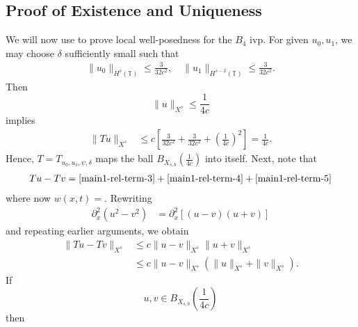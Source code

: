\documentclass[12pt,reqno]{amsart}
\numberwithin{equation}{section}  %
\renewcommand{\cref}{\Cref}
\newcommand{\ci}{\mathbb{T}}
\newcommand{\p}{\partial}
\begin{document}
\subsection{Proof of Existence and Uniqueness}
\label{sec:proof-b4-per-case}
%
%
%
%				 
%
We will now use \cref{prop:contraction} to prove local well-posedness for the 
$B_4$ ivp. For given $u_0, u_1$, we may choose $\delta$ sufficiently small such
that 
%
\begin{equation*}
	\begin{split}
    \|u_0\|_{H^s(\ci)} \le \frac{3}{32c^2}, \quad \|u_1\|_{H^{s-2}(\ci)} \le \frac{3}{32c^2}.
	\end{split}
\end{equation*}
%
Then $$\|u\|_{X^{s}} \le \frac{1}{4c}$$ implies
%
\begin{equation*}
	\begin{split}
		\|Tu \|_{X^{s}} 
		& \le c \left[ \frac{3}{32c^2} + \frac{3}{32c^2}+ \left( 
		\frac{1}{4c} \right)^2 \right]
		=  \frac{1}{4c}.
	\end{split}
\end{equation*}
%
Hence, $T=T_{u_0, u_1, \psi, \delta}$ maps the ball $B_{X_{s,b}}(\frac{1}{4c} )$ into
itself. Next, note that 
%
\begin{equation*}
	\begin{split}
    Tu - Tv = \cref{main1-rel-term-3} + \cref{main1-rel-term-4} +
    \cref{main1-rel-term-5} 
  \end{split}
  \label{eqn:integral-form-dif}
\end{equation*}
%
where now $w(x,t) =$. Rewriting
%
\begin{equation*}
	\begin{split}
	\p_x^2 (u^2 - v^2)	
		& = \p_x^2[(u-v)(u+v)]
		\end{split}
\end{equation*}
%
and repeating earlier arguments, we obtain
%
\begin{equation}
	\label{20a}
	\begin{split}
		\|Tu - Tv \|_{X^{s}}  
		& \le c \|u -v\|_{X^{s}} \|u + v \|_{X^{s}}
		\\
		& \le c \|u -v\|_{X^{s}} (\|u\|_{X^{s}}+ \|v \|_{X^{s}}).
	\end{split}
\end{equation}
%
If $$ u, v \in B_{X_{s,b}} \left (\frac{1}{4c} \right )$$ then
\end{document}

